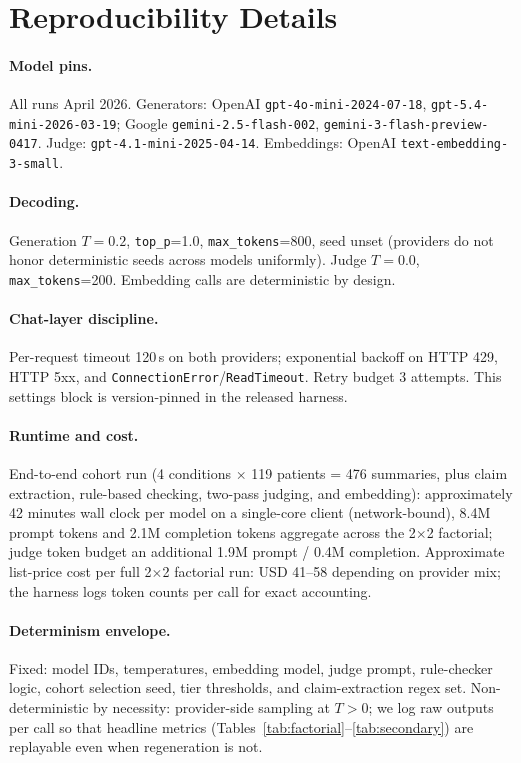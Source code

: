 \documentclass[11pt]{article}
\begin{document}
\section{Reproducibility Details}
\label{app:reproducibility}

\paragraph{Model pins.} All runs April 2026. Generators: OpenAI \texttt{gpt-4o-mini-2024-07-18}, \texttt{gpt-5.4-mini-2026-03-19}; Google \texttt{gemini-2.5-flash-002}, \texttt{gemini-3-flash-preview-0417}. Judge: \texttt{gpt-4.1-mini-2025-04-14}. Embeddings: OpenAI \texttt{text-embedding-3-small}.

\paragraph{Decoding.} Generation $T{=}0.2$, \texttt{top\_p}=1.0, \texttt{max\_tokens}=800, seed unset (providers do not honor deterministic seeds across models uniformly). Judge $T{=}0.0$, \texttt{max\_tokens}=200. Embedding calls are deterministic by design.

\paragraph{Chat-layer discipline.} Per-request timeout 120\,s on both providers; exponential backoff on HTTP 429, HTTP 5xx, and \texttt{ConnectionError}/\texttt{ReadTimeout}. Retry budget 3 attempts. This settings block is version-pinned in the released harness.

\paragraph{Runtime and cost.} End-to-end cohort run (4 conditions $\times$ 119 patients = 476 summaries, plus claim extraction, rule-based checking, two-pass judging, and embedding): approximately 42 minutes wall clock per model on a single-core client (network-bound), 8.4M prompt tokens and 2.1M completion tokens aggregate across the 2$\times$2 factorial; judge token budget an additional 1.9M prompt / 0.4M completion. Approximate list-price cost per full 2$\times$2 factorial run: USD 41--58 depending on provider mix; the harness logs token counts per call for exact accounting.

\paragraph{Determinism envelope.} Fixed: model IDs, temperatures, embedding model, judge prompt, rule-checker logic, cohort selection seed, tier thresholds, and claim-extraction regex set. Non-deterministic by necessity: provider-side sampling at $T{>}0$; we log raw outputs per call so that headline metrics (Tables~\ref{tab:factorial}--\ref{tab:secondary}) are replayable even when regeneration is not.
\end{document}
